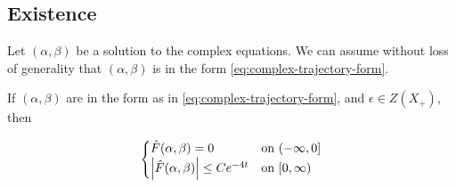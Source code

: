 \documentclass{article}
\begin{document}
\subsection{Existence}

Let \((\alpha, \beta)\) be a solution to the complex equations. We can assume without loss of generality that \((\alpha, \beta)\) is in the form \cref{eq:complex-trajectory-form}.

\begin{lemma}
    \label{lem:existence-bound}

    If \((\alpha, \beta)\) are in the form as in \cref{eq:complex-trajectory-form}, and \(\epsilon \in Z(X_+)\), then

    \[
    \begin{cases}
        \hat F(\alpha, \beta) = 0 & \text{on }(-\infty, 0] \\
        \abs{\hat F(\alpha, \beta)} \le Ce^{-4t} & \text{on }[0, \infty)
    \end{cases}\]
\end{lemma}
\end{document}
